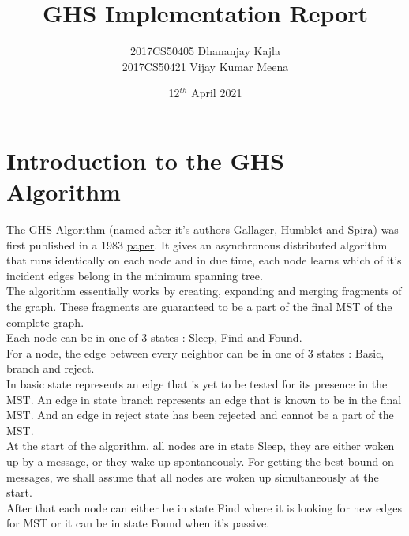 \documentclass[letterpaper,11pt]{article}
\title{{\bf GHS Implementation Report}}
\author{2017CS50405 Dhananjay Kajla \\ 2017CS50421 Vijay Kumar Meena}
\date{12$^{th}$ April 2021}
\begin{document}
	
	
	
	\maketitle
	
	\tableofcontents
	
	\section{Introduction to the GHS Algorithm}
	
	The GHS Algorithm (named after it's authors Gallager, Humblet and Spira) was first published in a 1983 \href{https://dl.acm.org/doi/abs/10.1145/357195.357200}{paper}. It gives an asynchronous distributed algorithm that runs identically on each node and in due time, each node learns which of it's incident edges belong in the minimum spanning tree. \\
	
 	
 	The algorithm essentially works by creating, expanding and merging fragments of the graph. These fragments are guaranteed to be a part of the final MST of the complete graph. \\
 	
 	Each node can be in one of 3 states : {\sc Sleep}, {\sc Find} and {\sc Found}. \\
 	
 	For a node, the edge between every neighbor can be in one of 3 states : {\sc Basic}, {\sc branch} and {\sc reject}. \\ 
 	
 	In basic state represents an edge that is yet to be tested for its presence in the MST. An edge in state branch represents an edge that is known to be in the final MST. And an edge in reject state has been rejected and cannot be a part of the MST. \\
 	
 	At the start of the algorithm, all nodes are in state {\sc Sleep}, they are either woken up by a message, or they wake up spontaneously. For getting the best bound on messages, we shall assume that all nodes are woken up simultaneously at the start. \\
 	
 	After that each node can either be in state {\sc Find} where it is looking for new edges for MST or it can be in state {\sc Found} when it's passive. \\
 	
\end{document}
